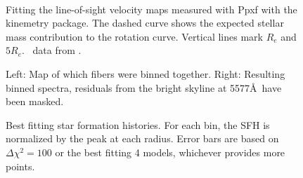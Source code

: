 \documentclass{emulateapj}
\newcommand\HI{\ion{H}{1}}
\begin{document}
\begin{figure*}
 \\
\caption{Fitting the line-of-sight velocity maps measured with Ppxf with the kinemetry package.  The dashed curve shows the expected stellar mass contribution to the rotation curve.  Vertical lines mark $R_e$ and $5R_e$.  \HI\ data from \citet{Pickering97}.  \label{malin_kinem}}
\end{figure*}




\begin{figure}
\caption{Left:  Map of which fibers were binned together.  Right:  Resulting binned spectra, residuals from the bright skyline at 5577\AA\ have been masked. \label{malin2_binmap}}
\end{figure}




\begin{figure}
\caption{ Best fitting star formation histories.  For each bin, the SFH is normalized by the peak at each radius.  Error bars are based on $\Delta\chi^2=100$ or the best fitting 4 models, whichever provides more points.  \label{sfh_malin2} }
\end{figure}
\end{document}
